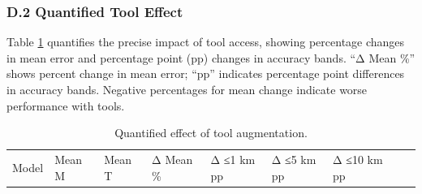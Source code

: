 \documentclass[
  10pt,
  twocolumn]{article}
\begin{document}
\subsubsection{D.2 Quantified Tool
Effect}\label{d.2-quantified-tool-effect}

Table \ref{tbl:tool_effect} quantifies the precise impact of tool
access, showing percentage changes in mean error and percentage point
(pp) changes in accuracy bands. ``Δ Mean \%'' shows percent change in
mean error; ``pp'' indicates percentage point differences in accuracy
bands. Negative percentages for mean change indicate worse performance
with tools.

\begin{longtable}[]{@{}
  >{\raggedright\arraybackslash}p{}
  >{\raggedright\arraybackslash}p{}
  >{\raggedright\arraybackslash}p{}
  >{\raggedright\arraybackslash}p{}
  >{\raggedright\arraybackslash}p{}
  >{\raggedright\arraybackslash}p{}
  >{\raggedright\arraybackslash}p{}
  >{\raggedright\arraybackslash}p{}
  >{\raggedright\arraybackslash}p{}@{}}
\caption{\label{tbl:tool_effect}Quantified effect of tool
augmentation.}\tabularnewline
\toprule\noalign{}
\begin{minipage}[b]{\linewidth}\raggedright
Model
\end{minipage} & \begin{minipage}[b]{\linewidth}\raggedright
Mean M
\end{minipage} & \begin{minipage}[b]{\linewidth}\raggedright
Mean T
\end{minipage} & \begin{minipage}[b]{\linewidth}\raggedright
Δ Mean \%
\end{minipage} & \begin{minipage}[b]{\linewidth}\raggedright
Δ ≤1 km pp
\end{minipage} & \begin{minipage}[b]{\linewidth}\raggedright
Δ ≤5 km pp
\end{minipage} & \begin{minipage}[b]{\linewidth}\raggedright
Δ ≤10 km pp
\end{minipage} & \begin{minipage}[b]{\linewidth}\raggedright

\end{minipage}
\end{longtable}
\end{document}

